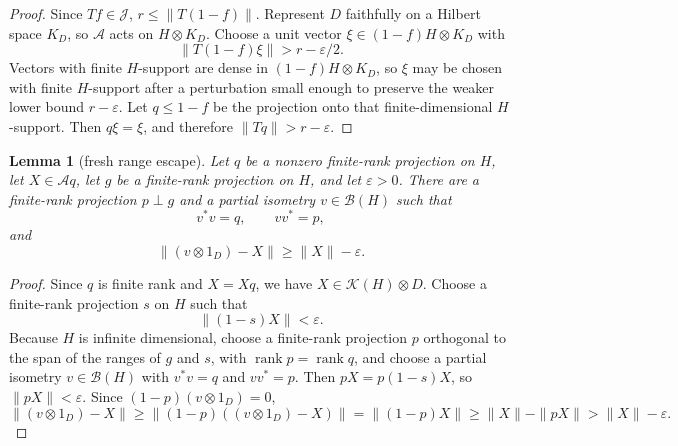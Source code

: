 \documentclass[11pt]{article}
\newtheorem{lemma}{Lemma}
\newcommand{\B}{\mathcal B}
\newcommand{\K}{\mathcal K}
\begin{document}
\begin{proof}
Since \(Tf\in\mathcal J\), \(r\le \|T(1-f)\|\).  Represent \(D\)
faithfully on a Hilbert space \(K_D\), so \(\mathcal A\) acts on
\(H\otimes K_D\).  Choose a unit vector
\(\xi\in (1-f)H\otimes K_D\) with
\[
        \|T(1-f)\xi\|>r-\varepsilon/2.
\]
Vectors with finite \(H\)-support are dense in \((1-f)H\otimes K_D\), so
\(\xi\) may be chosen with finite \(H\)-support after a perturbation small
enough to preserve the weaker lower bound \(r-\varepsilon\).
Let \(q\le1-f\) be the projection onto that finite-dimensional \(H\)-support.
Then \(q\xi=\xi\), and therefore \(\|Tq\|>r-\varepsilon\).
\end{proof}

\begin{lemma}[fresh range escape]
\label{lem:fresh-range}
Let \(q\) be a nonzero finite-rank projection on \(H\), let
\(X\in\mathcal A q\), let \(g\) be a finite-rank projection on \(H\), and let
\(\varepsilon>0\).  There are a finite-rank projection \(p\perp g\) and a
partial isometry \(v\in\B(H)\) such that
\[
        v^*v=q,\qquad vv^*=p,
\]
and
\[
        \|(v\otimes1_D)-X\|\ge \|X\|-\varepsilon.
\]
\end{lemma}

\begin{proof}
Since \(q\) is finite rank and \(X=Xq\), we have \(X\in\K(H)\otimes D\).
Choose a
finite-rank projection \(s\) on \(H\) such that
\[
        \|(1-s)X\|<\varepsilon.
\]
Because \(H\) is infinite dimensional, choose a finite-rank projection
\(p\) orthogonal to the span of the ranges of \(g\) and \(s\), with
\(\operatorname{rank}p=\operatorname{rank}q\), and
choose a partial isometry \(v\in\B(H)\) with \(v^*v=q\) and \(vv^*=p\).
Then \(pX=p(1-s)X\), so \(\|pX\|<\varepsilon\).  Since
\((1-p)(v\otimes1_D)=0\),
\[
        \|(v\otimes1_D)-X\|
        \ge
        \|(1-p)((v\otimes1_D)-X)\|
        =
        \|(1-p)X\|
        \ge
        \|X\|-\|pX\|
        >
        \|X\|-\varepsilon.
\]
\end{proof}
\end{document}
